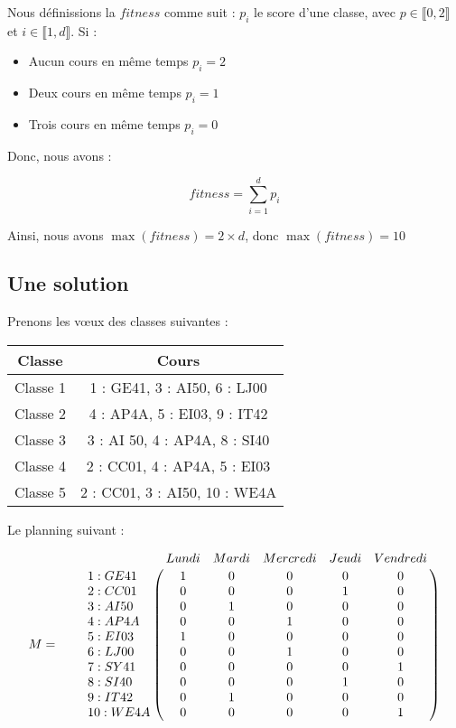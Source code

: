 Nous définissions la $fitness$ comme suit : $p_i$ le score d'une classe, avec $p \in \llbracket 0 , 2 \rrbracket$ et $i \in \llbracket 1 , d \rrbracket$.
Si :
\begin{itemize}
    \item Aucun cours en même temps $p_i = 2$
    \item Deux cours en même temps $p_i = 1$
    \item Trois cours en même temps $p_i = 0$
\end{itemize}

Donc, nous avons :

\begin{equation}
    fitness = \sum_{i = 1}^{d} p_i\label{eq:fitness}
\end{equation}

Ainsi, nous avons $\max(fitness) = 2 \times d$, donc $\max(fitness) = 10$

\subsection{Une solution}

Prenons les v\oe ux des classes suivantes :

\begin{center}
    \begin{tabular}{|c|c|}
        \hline
        Classe   & Cours                         \\
        \hline
        Classe 1 & 1 : GE41, 3 : AI50, 6 : LJ00  \\
        \hline
        Classe 2 & 4 : AP4A, 5 : EI03, 9 : IT42  \\
        \hline
        Classe 3 & 3 : AI 50, 4 : AP4A, 8 : SI40 \\
        \hline
        Classe 4 & 2 : CC01, 4 : AP4A, 5 : EI03  \\
        \hline
        Classe 5 & 2 : CC01, 3 : AI50, 10 : WE4A \\
        \hline
    \end{tabular}
\end{center}

Le planning suivant :

\[
    M = \qquad \bordermatrix{~  & \tikzmark{harrowleft} Lundi & Mardi & Mercredi & Jeudi
    & Vendredi\tikzmark{harrowright}  \cr
    \tikzmark{varrowtop}
    1 : GE41 & 1 & 0 & 0 & 0 & 0 \cr
    2 : CC01 & 0 & 0 & 0 & 1 & 0 \cr
    3 : AI50 & 0 & 1 & 0 & 0 & 0 \cr
    4 : AP4A & 0 & 0 & 1 & 0 & 0 \cr
    5 : EI03 & 1 & 0 & 0 & 0 & 0 \cr
    6 : LJ00 & 0 & 0 & 1 & 0 & 0 \cr
    7 : SY41 & 0 & 0 & 0 & 0 & 1 \cr
    8 : SI40 & 0 & 0 & 0 & 1 & 0 \cr
    9 : IT42 & 0 & 1 & 0 & 0 & 0 \cr
    \tikzmark{varrowbottom} 10 : WE4A & 0 & 0 & 0 & 0 & 1 \cr
    }
\]

